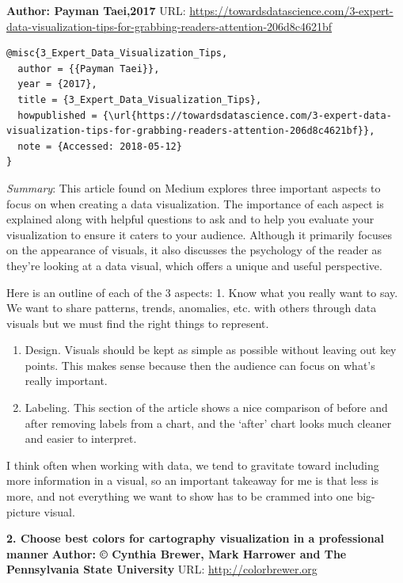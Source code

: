 \documentclass[]{book}
\theoremstyle{definition}
\theoremstyle{definition}
\theoremstyle{definition}
\theoremstyle{remark}
\begin{document}
\textbf{Author: Payman Taei,2017} URL:
\url{https://towardsdatascience.com/3-expert-data-visualization-tips-for-grabbing-readers-attention-206d8c4621bf}
\citep{3_Expert_Data_Visualization_Tips}

\begin{verbatim}
@misc{3_Expert_Data_Visualization_Tips,
  author = {{Payman Taei}},
  year = {2017},
  title = {3_Expert_Data_Visualization_Tips},
  howpublished = {\url{https://towardsdatascience.com/3-expert-data-visualization-tips-for-grabbing-readers-attention-206d8c4621bf}},
  note = {Accessed: 2018-05-12}
}
\end{verbatim}

\emph{Summary}: This article found on Medium explores three important
aspects to focus on when creating a data visualization. The importance
of each aspect is explained along with helpful questions to ask and to
help you evaluate your visualization to ensure it caters to your
audience. Although it primarily focuses on the appearance of visuals, it
also discusses the psychology of the reader as they're looking at a data
visual, which offers a unique and useful perspective.

Here is an outline of each of the 3 aspects: 1. Know what you really
want to say. We want to share patterns, trends, anomalies, etc. with
others through data visuals but we must find the right things to
represent.

\begin{enumerate}
\def\labelenumi{\arabic{enumi}.}
\setcounter{enumi}{1}
\item
  Design. Visuals should be kept as simple as possible without leaving
  out key points. This makes sense because then the audience can focus
  on what's really important.
\item
  Labeling. This section of the article shows a nice comparison of
  before and after removing labels from a chart, and the `after' chart
  looks much cleaner and easier to interpret.
\end{enumerate}

I think often when working with data, we tend to gravitate toward
including more information in a visual, so an important takeaway for me
is that less is more, and not everything we want to show has to be
crammed into one big-picture visual.

\textbf{2. Choose best colors for cartography visualization in a
professional manner} \textbf{Author: © Cynthia Brewer, Mark Harrower and
The Pennsylvania State University} URL: \url{http://colorbrewer.org}
\citep{best_colors_for_cartography_visualization}
\end{document}
